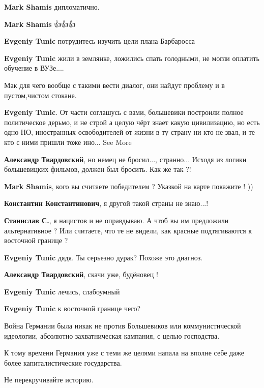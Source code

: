 \begin{itemize}
\begin{itemize}

\textbf{Mark Shamis} дипломатично.

\textbf{Mark Shamis} 👍👍👍


\textbf{Evgeniy Tunic} потрудитесь изучить цели плана Барбаросса

\textbf{Evgeniy Tunic} жили в землянке, ложились спать голодными, не могли
оплатить обучение в ВУЗе....

Мак для чего вообще с такими вести диалог, они найдут проблему и в пустом,чистом стокане.

\textbf{Evgeniy Tunic}. От части соглашусь с вами, большевики построили полное
политическое дерьмо, и не строй а целую чёрт знает какую цивилизацию, но есть
одно НО, иностранных освободителей от жизни в ту страну ни кто не звал, и те
кто с ними пришли тоже ино... See More

\textbf{Александр Твардовский}, но немец не бросил..., странно... Исходя из
логики большевицких фильмов, должен был бросить. Как же так ?!  

\textbf{Mark Shamis}, кого вы считаете победителем ? Указкой на карте покажите ! ))

\textbf{Константин Константинович}, я другой такой страны не знаю...!

\textbf{Станислав С.}, я нацистов и не оправдываю. А чтоб вы им предложили
альтернативное ? Или считаете, что те не видели, как красные подтягиваются к
восточной границе ?

\textbf{Evgeniy Tunic} дядя. Ты серьезно дурак? Похоже это диагноз.

\textbf{Александр Твардовский}, скачи уже, будёновец !

\textbf{Evgeniy Tunic} лечись, слабоумный

\textbf{Evgeniy Tunic} к восточной границе чего?

Война Германии была никак не против Большевиков или коммунистической идеологии,
абсолютно захватническая кампания, с целью господства.

К тому времени Германия уже с теми же целями напала на вполне себе даже более капиталистические государства.

Не перекручивайте историю.


\end{itemize}
\end{itemize}
